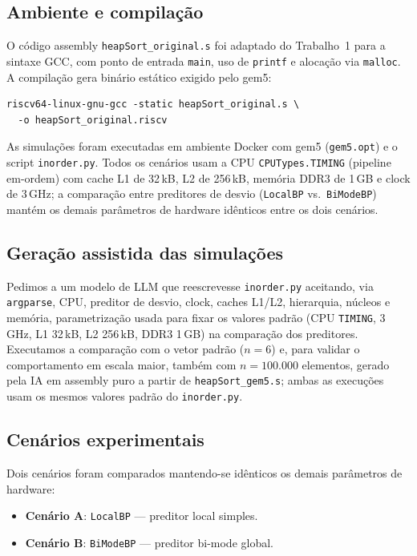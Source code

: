 \documentclass[12pt]{article}
\begin{document}
\subsection{Ambiente e compilação}

O código assembly \texttt{heapSort\_original.s} foi adaptado do Trabalho~1 para a sintaxe GCC, com ponto de entrada \texttt{main}, uso de \texttt{printf} e alocação via \texttt{malloc}. A compilação gera binário estático exigido pelo gem5:

\begin{verbatim}
riscv64-linux-gnu-gcc -static heapSort_original.s \
  -o heapSort_original.riscv
\end{verbatim}

As simulações foram executadas em ambiente Docker com gem5 (\texttt{gem5.opt}) e o script \texttt{inorder.py}. Todos os cenários usam a CPU \texttt{CPUTypes.TIMING} (pipeline em-ordem) com cache L1 de 32\,kB, L2 de 256\,kB, memória DDR3 de 1\,GB e clock de 3\,GHz; a comparação entre preditores de desvio (\texttt{LocalBP} vs.\ \texttt{BiModeBP}) mantém os demais parâmetros de hardware idênticos entre os dois cenários.

\subsection{Geração assistida das simulações}

Pedimos a um modelo de LLM que reescrevesse \texttt{inorder.py} aceitando, via \texttt{argparse}, CPU, preditor de desvio, clock, caches L1/L2, hierarquia, núcleos e memória, parametrização usada para fixar os valores padrão (CPU \texttt{TIMING}, 3\,GHz, L1 32\,kB, L2 256\,kB, DDR3 1\,GB) na comparação dos preditores. Executamos a comparação com o vetor padrão ($n=6$) e, para validar o comportamento em escala maior, também com $n=100.000$ elementos, gerado pela IA em assembly puro a partir de \texttt{heapSort\_gem5.s}; ambas as execuções usam os mesmos valores padrão do \texttt{inorder.py}.

\subsection{Cenários experimentais}

Dois cenários foram comparados mantendo-se idênticos os demais parâmetros de hardware:

\begin{itemize}
  \item \textbf{Cenário A}: \texttt{LocalBP} --- preditor local simples.
  \item \textbf{Cenário B}: \texttt{BiModeBP} --- preditor bi-mode global.
\end{itemize}
\end{document}
